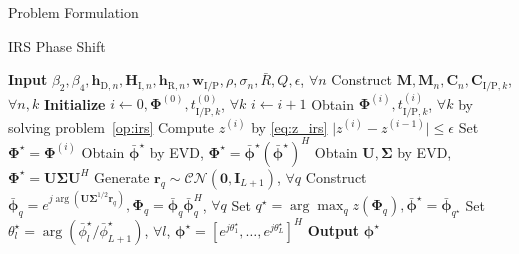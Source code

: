\documentclass[journal]{IEEEtran}
\begin{document}
\begin{section}{Problem Formulation}
\begin{subsection}{IRS Phase Shift}
\begin{algorithm}[!t]
				\caption{SCA: IRS Phase Shift.}
				\label{al:irs}
				\begin{algorithmic}[1]
					\State \textbf{Input} $\beta_2,\beta_4,\boldsymbol{h}_{\mathrm{D},n},\boldsymbol{H}_{\mathrm{I},n},\boldsymbol{h}_{\mathrm{R},n},\boldsymbol{w}_{\mathrm{I/P}},\rho,\sigma_n,\bar{R},Q,\epsilon$, $\forall n$
					\State Construct $\boldsymbol{M},\boldsymbol{M}_n,\boldsymbol{C}_{n},\boldsymbol{C}_{\mathrm{I/P},k}$, $\forall n,k$
					\State \textbf{Initialize} $i \gets 0,\boldsymbol{\Phi}^{(0)},t_{\mathrm{I/P},k}^{(0)}$, $\forall k$
					\Repeat
						\State $i \gets i + 1$
						\State Obtain $\boldsymbol{\Phi}^{(i)},t_{\mathrm{I/P},k}^{(i)}$, $\forall k$ by solving problem~\eqref{op:irs}
						\State Compute $z^{(i)}$ by \eqref{eq:z_irs}
					\Until $\lvert z^{(i)}-z^{(i-1)} \rvert \le \epsilon$
					\State Set $\boldsymbol{\Phi}^{\star}=\boldsymbol{\Phi}^{(i)}$
						\State Obtain $\bar{\boldsymbol{\phi}}^\star$ by EVD, $\boldsymbol{\Phi}^{\star}=\bar{\boldsymbol{\phi}}^\star(\bar{\boldsymbol{\phi}}^\star)^H$
					\Else
						\State Obtain $\boldsymbol{U},\boldsymbol{\Sigma}$ by EVD, $\boldsymbol{\Phi}^{\star}=\boldsymbol{U}\boldsymbol{\Sigma}\boldsymbol{U}^H$
						\State Generate $\boldsymbol{r}_q \sim \mathcal{CN}(\boldsymbol{0},\boldsymbol{I}_{L+1})$, $\forall q$
						\State Construct $\bar{\boldsymbol{\phi}}_q=e^{j\arg\left(\boldsymbol{U}\boldsymbol{\Sigma}^{1/2}\boldsymbol{r}_q\right)},\boldsymbol{\Phi}_q=\bar{\boldsymbol{\phi}}_q\bar{\boldsymbol{\phi}}_q^H$, $\forall q$
						\State Set $q^{\star}=\arg\max_q{z(\boldsymbol{\Phi}_q)},\bar{\boldsymbol{\phi}}^\star=\bar{\boldsymbol{\phi}}_{q^{\star}}$
					\EndIf
					\State Set $\theta_l^\star=\arg(\bar{\phi}_l^\star/\bar{\phi}_{L+1}^\star)$, $\forall l$, $\boldsymbol{\phi}^{\star}=[e^{j\theta_1^\star},\dots,e^{j\theta_L^\star}]^H$
					\State \textbf{Output} $\boldsymbol{\phi}^{\star}$
				\end{algorithmic}
			\end{algorithm}
		\end{subsection}



\end{section}
\end{document}
